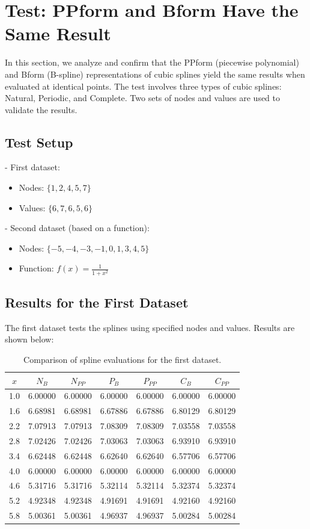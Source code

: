 \documentclass[a4paper]{article}
\begin{document}
\newpage
\section*{Test: PPform and Bform Have the Same Result}

In this section, we analyze and confirm that the PPform (piecewise polynomial) and Bform (B-spline) representations of cubic splines yield the same results when evaluated at identical points. The test involves three types of cubic splines: Natural, Periodic, and Complete. Two sets of nodes and values are used to validate the results.

\subsection*{Test Setup}

  - First dataset:
    \begin{itemize}
      \item Nodes: $\{1, 2, 4, 5, 7\}$
      \item Values: $\{6, 7, 6, 5, 6\}$
    \end{itemize}
  - Second dataset (based on a function):
    \begin{itemize}
      \item Nodes: $\{-5, -4, -3, -1, 0, 1, 3, 4, 5\}$
      \item Function: $f(x) = \frac{1}{1 + x^2}$
    \end{itemize}

\subsection*{Results for the First Dataset}

The first dataset tests the splines using specified nodes and values. Results are shown below:

\begin{table}[ht]
\centering
\begin{tabular}{|c|c|c|c|c|c|c|}
\hline
$x$ & $N_B$ & $N_{PP}$ & $P_B$ & $P_{PP}$ & $C_B$ & $C_{PP}$ \\
\hline
1.0 & 6.00000 & 6.00000 & 6.00000 & 6.00000 & 6.00000 & 6.00000 \\
1.6 & 6.68981 & 6.68981 & 6.67886 & 6.67886 & 6.80129 & 6.80129 \\
2.2 & 7.07913 & 7.07913 & 7.08309 & 7.08309 & 7.03558 & 7.03558 \\
2.8 & 7.02426 & 7.02426 & 7.03063 & 7.03063 & 6.93910 & 6.93910 \\
3.4 & 6.62448 & 6.62448 & 6.62640 & 6.62640 & 6.57706 & 6.57706 \\
4.0 & 6.00000 & 6.00000 & 6.00000 & 6.00000 & 6.00000 & 6.00000 \\
4.6 & 5.31716 & 5.31716 & 5.32114 & 5.32114 & 5.32374 & 5.32374 \\
5.2 & 4.92348 & 4.92348 & 4.91691 & 4.91691 & 4.92160 & 4.92160 \\
5.8 & 5.00361 & 5.00361 & 4.96937 & 4.96937 & 5.00284 & 5.00284 \\
\hline
\end{tabular}
\caption*{Comparison of spline evaluations for the first dataset.}
\end{table}
\end{document}
